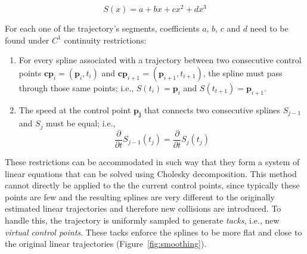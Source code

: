 \begin{equation}
	S(x)=a + bx + cx^2 + dx^3
	\label{eqn:splines}
\end{equation}

For each one of the trajectory's segments, coefficients $a$, $b$, $c$ and $d$ need to be found under $C^1$ continuity restrictions:
\begin{enumerate}
  \item For every spline associated with a trajectory between two consecutive control points $\mathbf{cp}_i=(\mathbf{p}_i,t_i)$ and $\mathbf{cp}_{i + 1}=(\mathbf{p}_{i + 1},t_{i + 1})$, the spline must pass through those same points; i.e., $S(t_i)=\mathbf{p}_i$ and $S(t_{t + 1})=\mathbf{p}_{i + 1}$.
  \item The speed at the control point $\mathbf{p_j}$ that connects two consecutive splines $S_{j - 1}$ and $S_{j}$ must be equal; i.e.,
  \begin{equation}
    		\frac{\partial}{\partial t} S_{j-1}(t_j) = 
  				\frac{\partial}{\partial t} S_{j}(t_j)
  \end{equation}
  
\end{enumerate}
  
These restrictions can be accommodated in such way that they form a system of linear equations that can be solved using Cholesky decomposition.
This method cannot directly be applied to the the current control points, since typically these points are few and the resulting splines are very different to the originally estimated linear trajectories and therefore new collisions are introduced.
To handle this, the trajectory is uniformly sampled to generate \emph{tacks}, i.e., new \emph{virtual control points}.
These tacks enforce the splines to be more flat and close to the original linear trajectories (Figure~\ref{fig:smoothing}).


